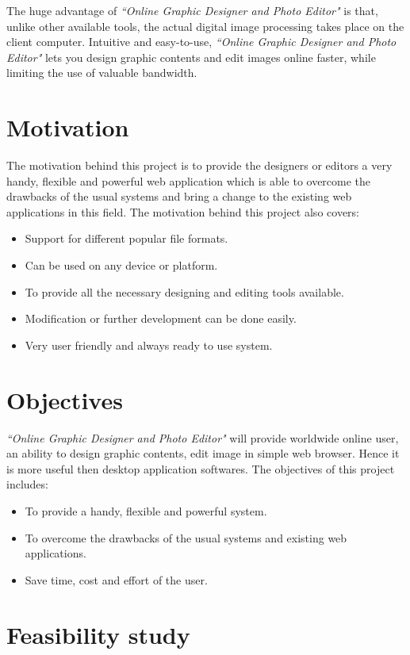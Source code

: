 \documentclass[12pt,a4 paper]{report}
\begin{document}
The huge advantage of \textit{``Online Graphic Designer and Photo Editor"} is that, unlike other available tools, the actual digital image processing takes place on the client computer. Intuitive and easy-to-use, \textit{``Online Graphic Designer and Photo Editor"} lets you design graphic contents and edit images online faster, while limiting the use of valuable bandwidth. \\

\section{Motivation}
The motivation behind this project is to provide the designers or editors a very handy, flexible and powerful web application which is able to overcome the drawbacks of the usual systems and bring a change to the existing web applications in this field. The  motivation behind this project also covers:

\begin{itemize}
\item Support for different popular file formats.
\item Can be used on any device or platform.
\item To provide all the necessary designing and editing tools available.
\item Modification or further development can be done easily.
\item Very user friendly and always ready to use system.
\end{itemize}

\section{Objectives}
\textit{``Online Graphic Designer and Photo Editor"} will provide worldwide online user, an ability to design graphic contents, edit image in simple web browser. Hence it is more useful then desktop application softwares. The objectives of this project includes:

\begin{itemize}
\item To provide a handy, flexible and powerful system.
\item To overcome the drawbacks of the usual systems and existing web applications.
\item Save time, cost and effort of the user.
\end{itemize}

\section{Feasibility study}
\end{document}
